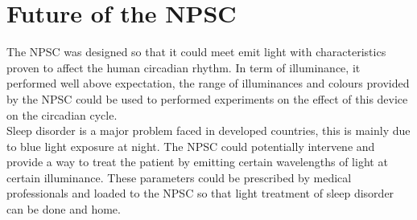 \chapter{Future of the NPSC}

The NPSC was designed so that it could meet emit light with characteristics proven to affect the human circadian rhythm. In term of illuminance, it performed well above expectation, the range of illuminances and colours provided by the NPSC could be used to performed experiments on the effect of this device on the circadian cycle.\\
Sleep disorder is a major problem faced in developed countries, this is mainly due to blue light exposure at night. The NPSC could potentially intervene and provide a way to treat the patient by emitting certain wavelengths of light at certain illuminance. These parameters could be prescribed by medical professionals and loaded to the NPSC so that light treatment of sleep disorder can be done and home.